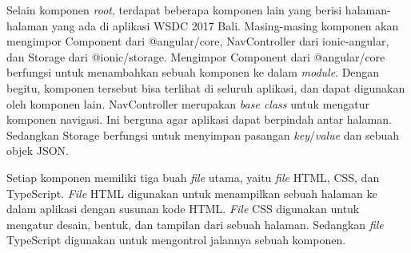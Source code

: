 Selain komponen \textit{root}, terdapat beberapa komponen lain yang berisi halaman-halaman yang ada di aplikasi WSDC 2017 Bali. Masing-masing komponen akan mengimpor Component dari @angular/core, NavController dari ionic-angular, dan Storage dari @ionic/storage. Mengimpor Component dari @angular/core berfungsi untuk menambahkan sebuah komponen ke dalam \textit{module}. Dengan begitu, komponen tersebut bisa terlihat di seluruh aplikasi, dan dapat digunakan oleh komponen lain. NavController merupakan \textit{base class} untuk mengatur komponen navigasi. Ini berguna agar aplikasi dapat berpindah antar halaman. Sedangkan Storage berfungsi untuk menyimpan pasangan \textit{key}/\textit{value} dan sebuah objek JSON.

Setiap komponen memiliki tiga buah \textit{file} utama, yaitu \textit{file} HTML, CSS, dan TypeScript. \textit{File} HTML digunakan untuk menampilkan sebuah halaman ke dalam aplikasi dengan susunan kode HTML. \textit{File} CSS digunakan untuk mengatur desain, bentuk, dan tampilan dari sebuah halaman. Sedangkan \textit{file} TypeScript digunakan untuk mengontrol jalannya sebuah komponen.

